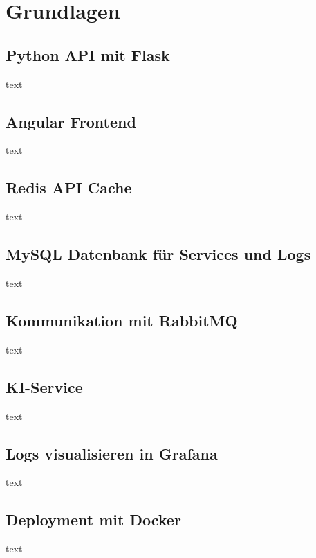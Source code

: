 \section{Grundlagen}

\subsection{Python API mit Flask}
text

\subsection{Angular Frontend}
text

\subsection{Redis API Cache}
text

\subsection{MySQL Datenbank für Services und Logs}
text

\subsection{Kommunikation mit RabbitMQ}
text

\subsection{KI-Service}
text

\subsection{Logs visualisieren in Grafana}
text

\subsection{Deployment mit Docker}
text
